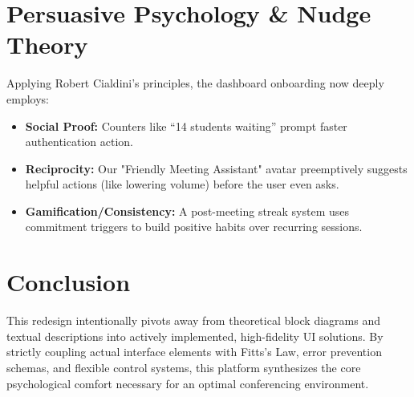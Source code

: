 \documentclass[12pt,a4paper]{article}
\begin{document}
\section{Persuasive Psychology \& Nudge Theory}
Applying Robert Cialdini's principles, the dashboard onboarding now deeply employs:
\begin{itemize}
    \item \textbf{Social Proof:} Counters like ``14 students waiting'' prompt faster authentication action.
    \item \textbf{Reciprocity:} Our "Friendly Meeting Assistant" avatar preemptively suggests helpful actions (like lowering volume) before the user even asks.
    \item \textbf{Gamification/Consistency:} A post-meeting streak system uses commitment triggers to build positive habits over recurring sessions.
\end{itemize}

\section{Conclusion}
This redesign intentionally pivots away from theoretical block diagrams and textual descriptions into actively implemented, high-fidelity UI solutions. By strictly coupling actual interface elements with Fitts's Law, error prevention schemas, and flexible control systems, this platform synthesizes the core psychological comfort necessary for an optimal conferencing environment.
\end{document}
